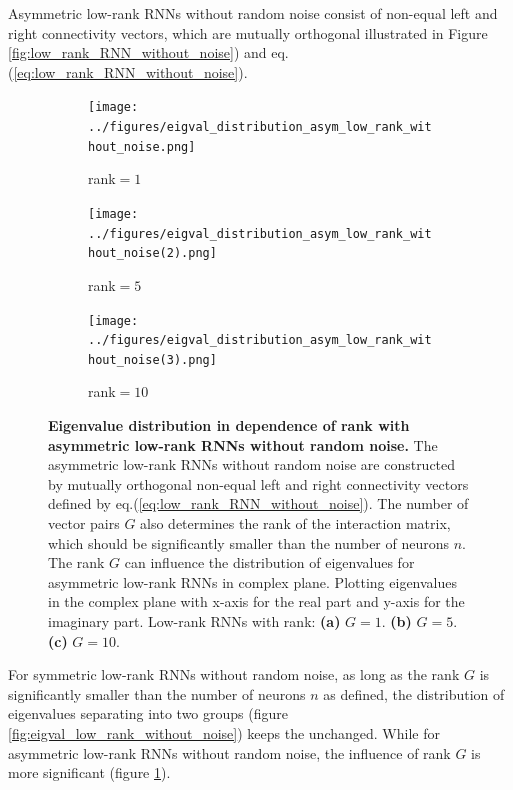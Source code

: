 \documentclass[11pt]{article}
\begin{document}
	Asymmetric low-rank RNNs without random noise consist of non-equal left and right connectivity vectors, which are mutually orthogonal illustrated in Figure \ref{fig:low_rank_RNN_without_noise}) and eq.(\ref{eq:low_rank_RNN_without_noise}). 
		\begin{figure}[H]
			\centering
			\begin{subfigure}[b]{0.3\textwidth}
				\centering
				\texttt{[image: ../figures/eigval\_distribution\_asym\_low\_rank\_without\_noise.png]}
				\caption{rank$=1$}
			\end{subfigure}
			\begin{subfigure}[b]{0.3\textwidth}
				\centering
				\texttt{[image: ../figures/eigval\_distribution\_asym\_low\_rank\_without\_noise(2).png]}
				\caption{rank$=5$}
			\end{subfigure}
			\begin{subfigure}[b]{0.3\textwidth}
				\centering
				\texttt{[image: ../figures/eigval\_distribution\_asym\_low\_rank\_without\_noise(3).png]}
				\caption{rank$=10$}
			\end{subfigure}
			\caption{\textbf{Eigenvalue distribution in dependence of rank with asymmetric low-rank RNNs without random noise.} The asymmetric low-rank RNNs without random noise are constructed by mutually orthogonal non-equal left and right connectivity vectors defined by eq.(\ref{eq:low_rank_RNN_without_noise}). The number of vector pairs $G$ also determines the rank of the interaction matrix, which should be significantly smaller than the number of neurons $n$. The rank $G$ can influence the distribution of eigenvalues for asymmetric low-rank RNNs in complex plane. Plotting eigenvalues in the complex plane with x-axis for the real part and y-axis for the imaginary part. Low-rank RNNs with rank: \textbf{(a)} $G=1$. \textbf{(b)} $G=5$. \textbf{(c)} $G=10$. }
			\label{fig:eigval_distribution_asym_low_rank_without_noise}
		\end{figure}
	
	For symmetric low-rank RNNs without random noise, as long as the rank $G$ is significantly smaller than the number of neurons $n$ as defined, the distribution of eigenvalues separating into two groups (figure \ref{fig:eigval_low_rank_without_noise}) keeps the unchanged. While for asymmetric low-rank RNNs without random noise, the influence of rank $G$ is more significant (figure \ref{fig:eigval_distribution_asym_low_rank_without_noise}). 
	
\end{document}
